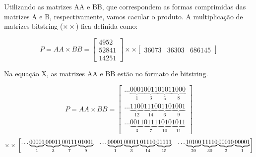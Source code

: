 \documentclass[12pt]{article}
\begin{document}
Utilizando as matrizes AA e BB, que correspondem as formas comprimidas das
matrizes A e B, respectivamente, vamos cacular o produto. A multiplicação de
matrizes bitstring ($\times\times$) fica definida como:

\begin{equation}
	P = AA \times BB = \begin{bmatrix}
			4952\\ 
			52841\\ 
			14251
		\end{bmatrix} 
        \times\times
        \begin{bmatrix}
			36073 & 36303 & 686145
		\end{bmatrix}
\end{equation}

Na equação X, as matrizes AA e BB estão no formato de bitstring.

\begin{equation}
	P = AA \times BB = 
    	\begin{bmatrix}

\ldots\underbrace{0001}_{1}\underbrace{0011}_{3}\underbrace{0101}_{5}\underbrace
{1000}_{8}\\

\ldots\underbrace{1100}_{12}\underbrace{1110}_{14}\underbrace{0110}_{6}
\underbrace{1001}_{9}\\ 

\ldots\underbrace{0011}_{3}\underbrace{0111}_{7}\underbrace{1010}_{10}
\underbrace{1011}_{11}
		\end{bmatrix}
\end{equation}
\begin{equation}
        \times\times \\
        \begin{bmatrix}

\ldots\underbrace{00001}_{1}\underbrace{00011}_{3}\underbrace{00111}_{7}
\underbrace{01001}_{9}  &

\ldots\underbrace{00001}_{1}\underbrace{00011}_{3}\underbrace{01110}_{14}
\underbrace{01111}_{15} & 	

\ldots\underbrace{10100}_{20}\underbrace{11110}_{30}\underbrace{00010}_{2}
\underbrace{00001}_{1}
		\end{bmatrix}
\end{equation}
\end{document}
